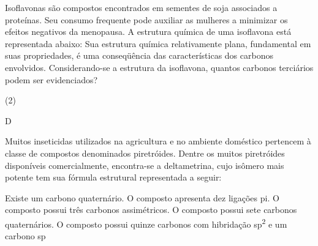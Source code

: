 \documentclass[10pt]{scrartcl}
\begin{document}
\begin{exercise}[points=1]
Isoflavonas são compostos encontrados em sementes de soja associados a proteínas. Seu consumo
frequente pode auxiliar as mulheres a minimizar os efeitos negativos da menopausa. A estrutura química de uma isoflavona está representada abaixo: Sua estrutura química relativamente plana, fundamental em suas propriedades, é uma conseqüência das características dos carbonos envolvidos.
Considerando-se a estrutura da isoflavona, quantos carbonos terciários podem ser evidenciados?


\begin{choice}(2)
\end{choice}
\end{exercise}

\begin{solution}
D
\end{solution}



\begin{exercise}[points=1]
Muitos inseticidas utilizados na agricultura e no ambiente doméstico pertencem à classe de compostos denominados piretróides. Dentre os muitos piretróides disponíveis comercialmente, encontra-se a deltametrina, cujo isômero mais potente tem sua fórmula estrutural representada a seguir:


\begin{choice}
\choice Existe um carbono quaternário.
\choice O composto apresenta dez ligações pi. 
\choice O composto possui três carbonos assimétricos.
\choice O composto possui sete carbonos quaternários.
\choice O composto possui quinze carbonos com hibridação sp\textsuperscript{2} e um carbono sp
\end{choice}
\end{exercise}
\begin{solution}

\end{solution}
\end{document}

